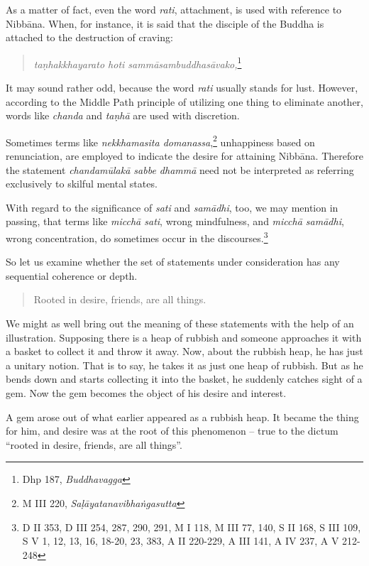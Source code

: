 As a matter of fact, even the word \emph{rati}, attachment, is used with reference to Nibbāna. When, for instance, it is said that the disciple of the Buddha is attached to the destruction of craving:

\begin{quote}
\emph{taṇhakkhayarato hoti sammāsambuddhasāvako,}\footnote{Dhp 187, \emph{Buddhavagga}}
\end{quote}

It may sound rather odd, because the word \emph{rati} usually stands for lust. However, according to the Middle Path principle of utilizing one thing to eliminate another, words like \emph{chanda} and \emph{taṇhā} are used with discretion.

Sometimes terms like \emph{nekkhamasita domanassa},\footnote{M III 220, \emph{Saḷāyatanavibhaṅgasutta}} unhappiness based on renunciation, are employed to indicate the desire for attaining Nibbāna. Therefore the statement \emph{chandamūlakā sabbe dhammā} need not be interpreted as referring exclusively to skilful mental states.

With regard to the significance of \emph{sati} and \emph{samādhi}, too, we may mention in passing, that terms like \emph{micchā sati}, wrong mindfulness, and \emph{micchā samādhi}, wrong concentration, do sometimes occur in the discourses.\footnote{D II 353, D III 254, 287, 290, 291, M I 118, M III 77, 140, S II 168, S III 109, S V 1, 12, 13, 16, 18-20, 23, 383, A II 220-229, A III 141, A IV 237, A V 212-248}

So let us examine whether the set of statements under consideration has any sequential coherence or depth.

\begin{quote}
Rooted in desire, friends, are all things.
\end{quote}

We might as well bring out the meaning of these statements with the help of an illustration. Supposing there is a heap of rubbish and someone approaches it with a basket to collect it and throw it away. Now, about the rubbish heap, he has just a unitary notion. That is to say, he takes it as just one heap of rubbish. But as he bends down and starts collecting it into the basket, he suddenly catches sight of a gem. Now the gem becomes the object of his desire and interest.

A gem arose out of what earlier appeared as a rubbish heap. It became the thing for him, and desire was at the root of this phenomenon -- true to the dictum ``rooted in desire, friends, are all things''.


